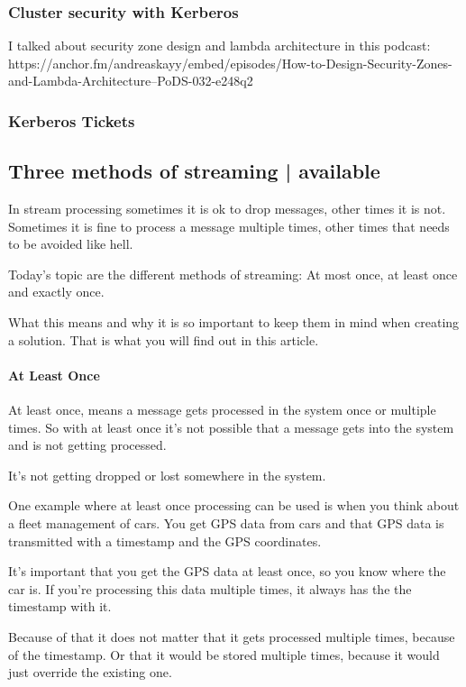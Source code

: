 \documentclass[12pt]{scrartcl} %
\begin{document}
\subsubsection{Cluster security with Kerberos}

I talked about security zone design and lambda architecture in this podcast: https://anchor.fm/andreaskayy/embed/episodes/How-to-Design-Security-Zones-and-Lambda-Architecture--PoDS-032-e248q2

\subsubsection{Kerberos Tickets}

\subsection{Three methods of streaming | available}

In stream processing sometimes it is ok to drop messages, other times it is not. Sometimes it is fine to process a message multiple times, other times that needs to be avoided like hell.

Today’s topic are the different methods of streaming: At most once, at least once and exactly once.

What this means and why it is so important to keep them in mind when creating a solution. That is what you will find out in this article.

\paragraph{At Least Once}

At least once, means a message gets processed in the system once or multiple times. So with at least once it’s not possible that a message gets into the system and is not getting processed.

It’s not getting dropped or lost somewhere in the system.

One example where at least once processing can be used is when you think about a fleet management of cars. You get GPS data from cars and that GPS data is transmitted with a timestamp and the GPS coordinates.

It’s important that you get the GPS data at least once, so you know where the car is. If you’re processing this data multiple times, it always has the the timestamp with it.

Because of that it does not matter that it gets processed multiple times, because of the timestamp. Or that it would be stored multiple times, because it would just override the existing one.
\end{document}
